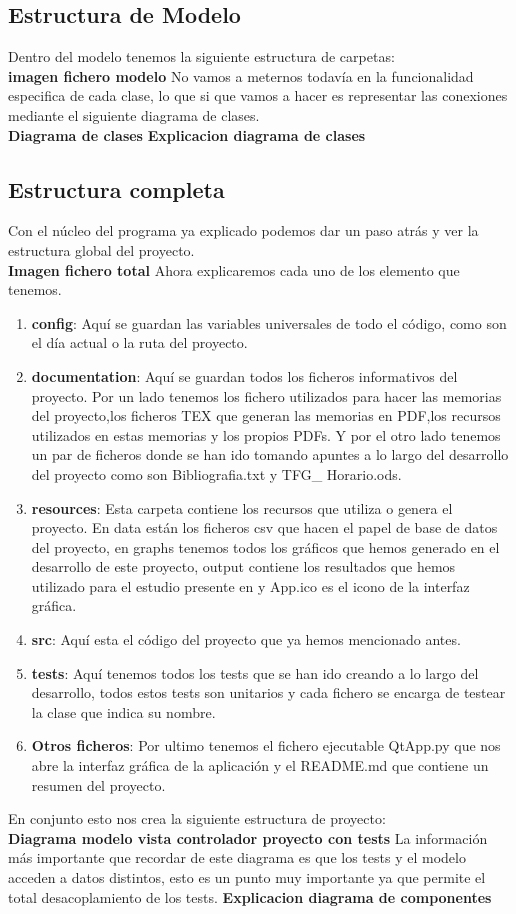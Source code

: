\documentclass[12pt,a4paper]{article}
\begin{document}
	\subsection{Estructura de Modelo}
	Dentro del modelo tenemos la siguiente estructura de carpetas:\\
	\textbf{imagen fichero modelo}
	No vamos a meternos todavía en la funcionalidad especifica de cada clase, lo que si que vamos a hacer es representar las conexiones mediante el siguiente diagrama de clases.\\
	\textbf{Diagrama de clases}
	\textbf{Explicacion diagrama de clases}
	\subsection{Estructura completa}
	Con el núcleo del programa ya explicado podemos dar un paso atrás y ver la estructura global del proyecto.\\
	\textbf{Imagen fichero total}
	Ahora explicaremos cada uno de los elemento que tenemos.\\
	\begin{enumerate}
	\item \textbf{config}: Aquí se guardan las variables universales de todo el código, como son el día actual o la ruta del proyecto.
	\item \textbf{documentation}: Aquí se guardan todos los ficheros informativos del proyecto. Por un lado tenemos los fichero utilizados para hacer las memorias del proyecto,los ficheros TEX que generan las memorias en PDF,los recursos utilizados en estas memorias y los propios PDFs. Y por el otro lado tenemos un par de ficheros donde se han ido tomando apuntes a lo largo del desarrollo del proyecto como son Bibliografia.txt y TFG\_ Horario.ods.
	\item \textbf{resources}: Esta carpeta contiene los recursos que utiliza o genera el proyecto. En data están los ficheros csv que hacen el papel de base de datos del proyecto, en graphs tenemos todos los gráficos que hemos generado en el desarrollo de este proyecto, output contiene los resultados que hemos utilizado para el estudio presente en \cite{Princial} y App.ico es el icono de la interfaz gráfica.
	\item \textbf{src}: Aquí esta el código del proyecto que ya hemos mencionado antes.
	\item \textbf{tests}: Aquí tenemos todos los tests que se han ido creando a lo largo del desarrollo, todos estos tests son unitarios y cada fichero se encarga de testear la clase que indica su nombre.
	\item \textbf{Otros ficheros}: Por ultimo tenemos el fichero ejecutable QtApp.py que nos abre la interfaz gráfica de la aplicación y el README.md que contiene un resumen del proyecto.
	\end{enumerate}
	En conjunto esto nos crea la siguiente estructura de proyecto:\\
	\textbf{Diagrama modelo vista controlador proyecto con tests}
	La información más importante que recordar de este diagrama es que los tests y el modelo acceden a datos distintos, esto es un punto muy importante ya que permite el total desacoplamiento de los tests.
	\textbf{Explicacion diagrama de componentes}
\end{document}
